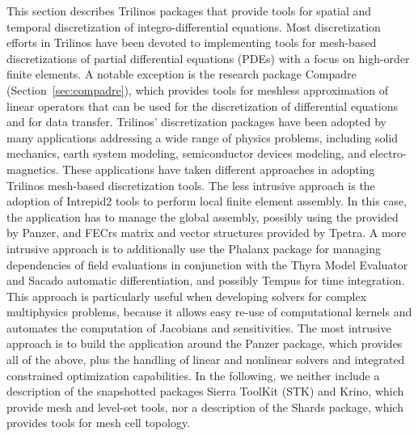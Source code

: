 
This section describes Trilinos packages that provide tools for spatial and temporal discretization of integro-differential equations. Most discretization efforts in Trilinos have been devoted to implementing tools for mesh-based discretizations of partial differential equations (PDEs) with a focus on high-order finite elements. A notable exception is the research package Compadre (Section~\ref{sec:compadre}), which provides tools for meshless approximation of linear operators that can be used for the discretization of differential equations and for data transfer.
Trilinos' discretization packages have been adopted by many applications addressing a wide range of physics problems, including solid mechanics, earth system modeling, semiconductor devices modeling, and electro-magnetics. These applications have taken different approaches in adopting Trilinos mesh-based discretization tools. The less intrusive approach is the adoption of Intrepid2 tools to perform local finite element assembly. In this case, the application has to manage the global assembly, possibly using the  provided by Panzer, and FECrs matrix and vector structures provided by Tpetra.
A more intrusive approach is to additionally use the Phalanx package for managing dependencies of field evaluations in conjunction with the Thyra Model Evaluator and Sacado automatic differentiation, and possibly Tempus for time integration. This approach is particularly useful when developing solvers for complex multiphysics problems, because it allows easy re-use of computational kernels and automates the computation of Jacobians and sensitivities.
The most intrusive approach is to build the application around the Panzer package, which provides all of the above, plus the handling of linear and nonlinear solvers and integrated constrained optimization capabilities.
In the following, we neither include a description of the snapshotted packages Sierra ToolKit (STK) and Krino, which provide mesh and level-set tools, nor a description of the Shards package, which provides tools for mesh cell topology.

